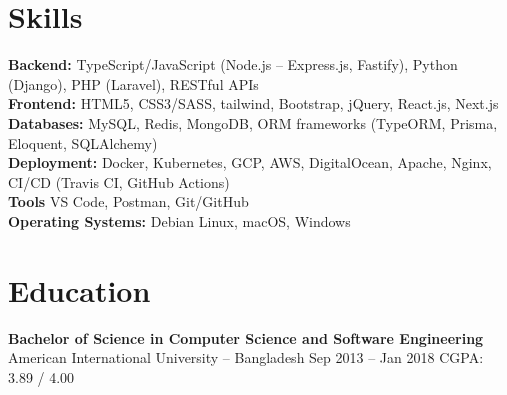 \documentclass[a4paper,10pt]{article}
\begin{document}
\section*{Skills}
\textbf{Backend:} TypeScript/JavaScript (Node.js – Express.js, Fastify), Python (Django), PHP (Laravel), RESTful APIs\\
\textbf{Frontend:} HTML5, CSS3/SASS, tailwind, Bootstrap, jQuery, React.js, Next.js\\
\textbf{Databases:} MySQL, Redis, MongoDB, ORM frameworks (TypeORM, Prisma, Eloquent, SQLAlchemy)\\
\textbf{Deployment:} Docker, Kubernetes, GCP, AWS, DigitalOcean, Apache, Nginx, CI/CD (Travis CI, GitHub Actions)\\
\textbf{Tools} VS Code, Postman, Git/GitHub\\
\textbf{Operating Systems:} Debian Linux, macOS, Windows
\section*{Education}
\textbf{Bachelor of Science in Computer Science and Software Engineering}\\
American International University -- Bangladesh \hfill Sep 2013 -- Jan 2018 \hspace{1em} CGPA: 3.89 / 4.00
\end{document}
